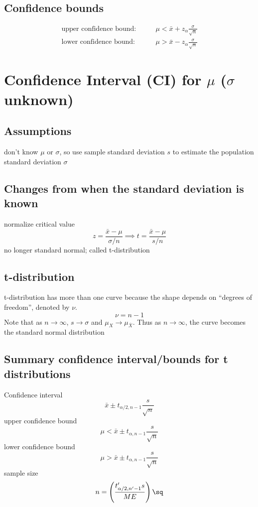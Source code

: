 \subsection{Confidence bounds}  %
\begin{align}
    \text{upper confidence bound:} \qquad &\mu < \bar x + z_{\alpha}\frac{\sigma}{\sqrt n} \\
    \text{lower confidence bound:} \qquad &\mu > \bar x - z_{\alpha}\frac{\sigma}{\sqrt n}
\end{align}

\section{Confidence Interval (CI) for \(\mu\) (\(\sigma\) unknown)}  %
\subsection{Assumptions}  %
don't know \(\mu\) or \(\sigma\), so use sample standard deviation \(s\) to estimate the population standard deviation \(\sigma\)

\subsection{Changes from when the standard deviation is known}  %
normalize critical value
\begin{equation}
    z=\frac{\bar x - \mu}{\sigma/n} \implies t=\frac{\bar x - \mu}{s/n}
\end{equation}
no longer standard normal; called t-distribution

\subsection{t-distribution}  %
t-distribution has more than one curve because the shape depends on ``degrees of freedom'', denoted by \(\nu\).
\begin{equation}
    \nu=n-1
\end{equation}
Note that as \(n\to\infty\), \(s\to\sigma\) and \(\mu_X\to \mu_{\bar X}\). Thus as \(n\to\infty\), the curve becomes the standard normal distribution

\subsection{Summary confidence interval/bounds for t distributions}  %
Confidence interval
\begin{equation}
    \bar x \pm t_{\alpha/2,n-1}\frac{s}{\sqrt n}
\end{equation}
upper confidence bound
\begin{equation}
    \mu < \bar x \pm t_{\alpha,n-1}\frac{s}{\sqrt n}
\end{equation}
lower confidence bound
\begin{equation}
    \mu > \bar x \pm t_{\alpha,n-1}\frac{s}{\sqrt n}
\end{equation}
sample size
\begin{equation}
    n=\left(\frac{t_{\alpha/2,n'-1}'s}{ME}\right)\sq
\end{equation}